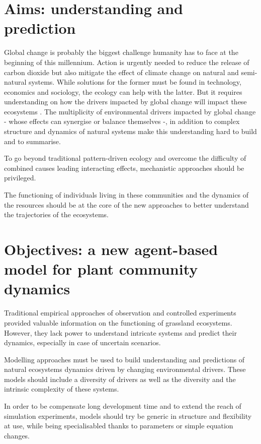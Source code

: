 \section{Aims: understanding and prediction}

Global change is probably the biggest challenge humanity has to face at the beginning of this millennium. Action is urgently needed to reduce the release of carbon dioxide but also mitigate the effect of climate change on natural and semi-natural systems. While solutions for the former must be found in technology, economics and sociology, the ecology can help with the latter. But it requires understanding on how the drivers impacted by global change will impact these ecosystems . The multiplicity of environmental drivers impacted by global change - whose effects can synergise or balance themselves -, in addition to complex structure and dynamics of natural systems make this understanding hard to build and to summarise.

To go beyond traditional pattern-driven ecology and overcome the difficulty of combined causes leading interacting effects, mechanistic approaches should be privileged. 

The functioning of individuals living in these communities and the dynamics of the resources should be at the core of the new approaches to better understand the trajectories of the ecosystems.

%

\section{Objectives: a new agent-based model for plant community dynamics} %
Traditional empirical approaches of observation and controlled experiments provided valuable information on the functioning of grassland ecosystems. However, they lack power to understand intricate systems and predict their dynamics, especially in case of uncertain scenarios. 

Modelling approaches must be used to build understanding and predictions of natural ecosystems dynamics driven by changing environmental drivers. These models should include a diversity of drivers as well as the diversity and the intrinsic complexity of these systems.

In order to be compensate long development time and to extend the reach of simulation experiments, models should try be generic in structure and flexibility at use, while being specialisabled thanks to parameters or simple equation changes.

